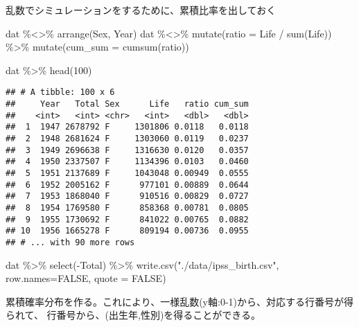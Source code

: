 \documentclass[
]{book}
\newenvironment{Shaded}{\begin{snugshade}}{\end{snugshade}}
\newcommand{\AttributeTok}[1]{\textcolor[rgb]{0.77,0.63,0.00}{#1}}
\newcommand{\ConstantTok}[1]{\textcolor[rgb]{0.00,0.00,0.00}{#1}}
\newcommand{\DecValTok}[1]{\textcolor[rgb]{0.00,0.00,0.81}{#1}}
\newcommand{\FunctionTok}[1]{\textcolor[rgb]{0.00,0.00,0.00}{#1}}
\newcommand{\NormalTok}[1]{#1}
\newcommand{\SpecialCharTok}[1]{\textcolor[rgb]{0.00,0.00,0.00}{#1}}
\newcommand{\StringTok}[1]{\textcolor[rgb]{0.31,0.60,0.02}{#1}}
\begin{document}
乱数でシミュレーションをするために、累積比率を出しておく

\begin{Shaded}
\begin{Highlighting}[]
\NormalTok{dat }\SpecialCharTok{\%\textless{}\textgreater{}\%}
        \FunctionTok{arrange}\NormalTok{(Sex, Year)}
\NormalTok{dat }\SpecialCharTok{\%\textless{}\textgreater{}\%}
        \FunctionTok{mutate}\NormalTok{(}\AttributeTok{ratio =}\NormalTok{ Life }\SpecialCharTok{/} \FunctionTok{sum}\NormalTok{(Life)) }\SpecialCharTok{\%\textgreater{}\%}
        \FunctionTok{mutate}\NormalTok{(}\AttributeTok{cum\_sum =} \FunctionTok{cumsum}\NormalTok{(ratio))}

\NormalTok{dat }\SpecialCharTok{\%\textgreater{}\%} \FunctionTok{head}\NormalTok{(}\DecValTok{100}\NormalTok{)}
\end{Highlighting}
\end{Shaded}

\begin{verbatim}
## # A tibble: 100 x 6
##     Year   Total Sex      Life   ratio cum_sum
##    <int>   <int> <chr>   <int>   <dbl>   <dbl>
##  1  1947 2678792 F     1301806 0.0118   0.0118
##  2  1948 2681624 F     1303060 0.0119   0.0237
##  3  1949 2696638 F     1316630 0.0120   0.0357
##  4  1950 2337507 F     1134396 0.0103   0.0460
##  5  1951 2137689 F     1043048 0.00949  0.0555
##  6  1952 2005162 F      977101 0.00889  0.0644
##  7  1953 1868040 F      910516 0.00829  0.0727
##  8  1954 1769580 F      858368 0.00781  0.0805
##  9  1955 1730692 F      841022 0.00765  0.0882
## 10  1956 1665278 F      809194 0.00736  0.0955
## # ... with 90 more rows
\end{verbatim}

\begin{Shaded}
\begin{Highlighting}[]
\NormalTok{dat }\SpecialCharTok{\%\textgreater{}\%} 
        \FunctionTok{select}\NormalTok{(}\SpecialCharTok{{-}}\NormalTok{Total) }\SpecialCharTok{\%\textgreater{}\%} 
        \FunctionTok{write.csv}\NormalTok{(}\StringTok{"./data/ipss\_birth.csv"}\NormalTok{, }\AttributeTok{row.names=}\ConstantTok{FALSE}\NormalTok{, }\AttributeTok{quote =} \ConstantTok{FALSE}\NormalTok{)}
\end{Highlighting}
\end{Shaded}

累積確率分布を作る。これにより、一様乱数(y軸:0-1)から、対応する行番号が得られて、
行番号から、(出生年,性別)を得ることができる。
\end{document}

